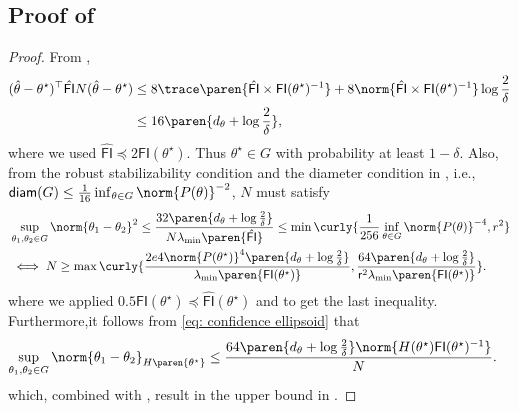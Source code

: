\subsection{Proof of \texorpdfstring{}{}}
\label{subsec: proof of RC upper bound}
\begin{proof}
    From , 
    \begin{align*}
        (\hat\theta-\theta^\star)^\top \hat{\mathsf{FI}}N (\hat\theta - \theta^\star) &\leq 8\trace\paren{\hat{\mathsf{FI}} \times \mathsf{FI}(\theta^\star)^{-1}} + 8\norm{\hat{\mathsf{FI}}\times\mathsf{FI}(\theta^\star)^{-1}}\log\frac{2}{\delta} \\
        &\leq 16\paren{d_\theta+\log\frac{2}{\delta}},
    \end{align*}
    where we used $\hat{\mathsf{FI}}\preceq2\mathsf{FI}(\theta^\star)$. Thus $\theta^\star\in G$ with probability at least $1-\delta$. Also, from the robust stabilizability condition and the diameter condition in , i.e., $\mathsf{diam}(G)\leq\frac{1}{16}\inf_{\theta\in G}\norm{P(\theta)}^{-2}$, $N$ must satisfy
    \begin{align*}
        &\sup_{\theta_1, \theta_2\in G}\norm{\theta_1-\theta_2}^2
        \leq \frac{32\paren{d_\theta+\log\frac{2}{\delta}}}{N\lambda_{\min}\paren{\hat{\mathsf{FI}}}} 
        \leq \min\curly{\frac{1}{256}\inf_{\theta\in G}\norm{P(\theta)}^{-4}, r^2} \\
        &\iff N \geq \max\curly{\frac{2e4\norm{P(\theta^\star)}^4\paren{d_\theta+\log\frac{2}{\delta}}}{\lambda_{\min}\paren{\mathsf{FI}(\theta^\star)}}, \frac{64 \paren{d_\theta+\log\frac{2}{\delta}}}{\mathsf{r}^2 \lambda_{\min}\paren{\mathsf{FI}(\theta^\star)}}}.
    \end{align*}
    where we applied $0.5\mathsf{FI}(\theta^\star)\preceq\hat{\mathsf{FI}}(\theta^\star)$ and  to get the last inequality. 
    Furthermore,it follows from \eqref{eq: confidence ellipsoid} that
    \begin{align*}
        \sup_{\theta_1, \theta_2\in G}\norm{\theta_1-\theta_2}_{H\paren{\theta^\star}} 
        &\leq \frac{64\paren{d_\theta+\log\frac{2}{\delta}}\norm{H(\theta^\star)\mathsf{FI}(\theta^\star)^{-1}}}{N}.
    \end{align*}
    which, combined with , result in the upper bound in . 
\end{proof}
